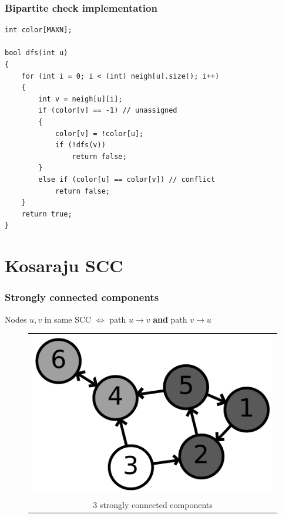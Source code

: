 \documentclass[12pt]{beamer}
\begin{document}
\begin{frame}[fragile]
\frametitle{Bipartite check implementation}
\begin{lstlisting}
int color[MAXN];

bool dfs(int u)
{
    for (int i = 0; i < (int) neigh[u].size(); i++)
    {
        int v = neigh[u][i];
        if (color[v] == -1) // unassigned
        {
            color[v] = !color[u];
            if (!dfs(v))
                return false;
        }
        else if (color[u] == color[v]) // conflict
            return false;
    }
    return true;
}
\end{lstlisting}
\end{frame}

\section{Kosaraju SCC}

\begin{frame}
\frametitle{Strongly connected components}
Nodes $u,v$ in same SCC $\Leftrightarrow$ path $u \to v$ \textbf{and} path $v \to u$
\begin{figure}
\centering
\begin{tabular}{c}
\includegraphics[width=0.5\linewidth]{img/6n-scc} \\
3 strongly connected components
\end{tabular}
\end{figure}
\end{frame}
\end{document}
